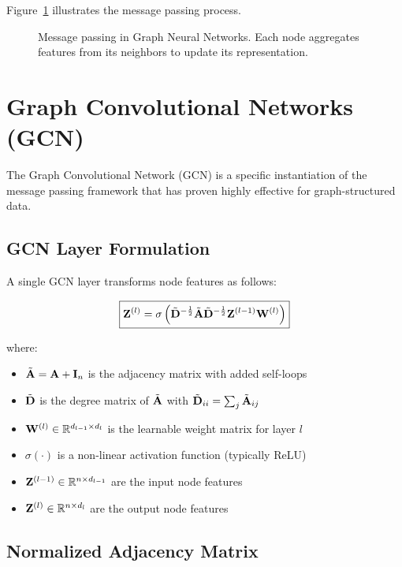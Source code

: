 Figure~\ref{fig:message_passing} illustrates the message passing process.

\begin{figure}[H]
    \centering
    
    \caption{Message passing in Graph Neural Networks. Each node aggregates features from its neighbors to update its representation.}
    \label{fig:message_passing}
\end{figure}

\section{Graph Convolutional Networks (GCN)}

The Graph Convolutional Network (GCN) \cite{kipf2017} is a specific instantiation of the message passing framework that has proven highly effective for graph-structured data.

\subsection{GCN Layer Formulation}

A single GCN layer transforms node features as follows:

\begin{equation}
\boxed{
    \mathbf{Z}^{(l)} = \sigma\left(\tilde{\mathbf{D}}^{-\frac{1}{2}} \tilde{\mathbf{A}} \tilde{\mathbf{D}}^{-\frac{1}{2}} \mathbf{Z}^{(l-1)} \mathbf{W}^{(l)}\right)
}
\label{eq:gcn_layer}
\end{equation}

where:
\begin{itemize}
    \item $\tilde{\mathbf{A}} = \mathbf{A} + \mathbf{I}_n$ is the adjacency matrix with added self-loops
    \item $\tilde{\mathbf{D}}$ is the degree matrix of $\tilde{\mathbf{A}}$ with $\tilde{\mathbf{D}}_{ii} = \sum_j \tilde{\mathbf{A}}_{ij}$
    \item $\mathbf{W}^{(l)} \in \mathbb{R}^{d_{l-1} \times d_l}$ is the learnable weight matrix for layer $l$
    \item $\sigma(\cdot)$ is a non-linear activation function (typically ReLU)
    \item $\mathbf{Z}^{(l-1)} \in \mathbb{R}^{n \times d_{l-1}}$ are the input node features
    \item $\mathbf{Z}^{(l)} \in \mathbb{R}^{n \times d_l}$ are the output node features
\end{itemize}

\subsection{Normalized Adjacency Matrix}

